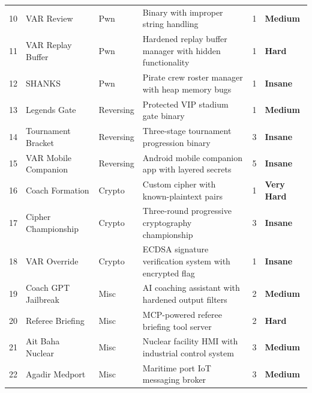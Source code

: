 \documentclass[a4paper,10pt]{article}
\newcommand{\medium}{\textbf{Medium}}
\newcommand{\hard}{\textbf{Hard}}
\newcommand{\vhard}{\textbf{Very Hard}}
\newcommand{\insane}{\textbf{Insane}}
\begin{document}
\begin{longtable}{>{\raggedright}p{0.5cm} >{\raggedright}p{3.5cm} >{\raggedright}p{2.2cm} >{\raggedright}p{10cm} p{1.2cm} >{\raggedright\arraybackslash}p{1.8cm}}
10 & VAR Review              & Pwn        & Binary with improper string handling                                             & 1 & \medium   \\
11 & VAR Replay Buffer       & Pwn        & Hardened replay buffer manager with hidden functionality                         & 1 & \hard     \\
12 & SHANKS                  & Pwn        & Pirate crew roster manager with heap memory bugs                                 & 1 & \insane   \\

13 & Legends Gate            & Reversing  & Protected VIP stadium gate binary                                                & 1 & \medium   \\
14 & Tournament Bracket      & Reversing  & Three-stage tournament progression binary                                        & 3 & \insane   \\
15 & VAR Mobile Companion    & Reversing  & Android mobile companion app with layered secrets                                 & 5 & \insane   \\

16 & Coach Formation         & Crypto     & Custom cipher with known-plaintext pairs                                         & 1 & \vhard    \\
17 & Cipher Championship     & Crypto     & Three-round progressive cryptography championship                                & 3 & \insane   \\
18 & VAR Override            & Crypto     & ECDSA signature verification system with encrypted flag                          & 1 & \insane   \\

19 & Coach GPT Jailbreak     & Misc       & AI coaching assistant with hardened output filters                               & 2 & \medium   \\
20 & Referee Briefing        & Misc       & MCP-powered referee briefing tool server                                         & 2 & \hard     \\
21 & Ait Baha Nuclear        & Misc       & Nuclear facility HMI with industrial control system                              & 3 & \medium   \\
22 & Agadir Medport          & Misc       & Maritime port IoT messaging broker                                               & 3 & \medium   \\


\end{longtable}
\end{document}
